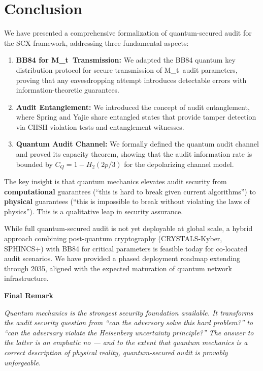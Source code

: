 \documentclass[11pt,a4paper]{article}
\theoremstyle{plain}
\theoremstyle{definition}
\theoremstyle{remark}
\newenvironment{bilingual}[2]{%
  \medskip\noindent\textbf{#1}\par\noindent\textit{#2}\par\smallskip
}{}
\newcommand{\Mt}{M_t}
\begin{document}
\section{Conclusion}
\label{sec:conclusion}

We have presented a comprehensive formalization of quantum-secured audit
for the SCX framework, addressing three fundamental aspects:

\begin{enumerate}[label=(\arabic*)]
  \item \textbf{BB84 for \Mt\ Transmission:} We adapted the BB84 quantum
        key distribution protocol for secure transmission of \Mt\ audit
        parameters, proving that any eavesdropping attempt introduces
        detectable errors with information-theoretic guarantees.
  
  \item \textbf{Audit Entanglement:} We introduced the concept of
        audit entanglement, where Spring and Yajie share entangled
        states that provide tamper detection via CHSH violation tests
        and entanglement witnesses.
  
  \item \textbf{Quantum Audit Channel:} We formally defined the quantum
        audit channel and proved its capacity theorem, showing that the
        audit information rate is bounded by $C_Q = 1 - H_2(2p/3)$
        for the depolarizing channel model.
\end{enumerate}

The key insight is that quantum mechanics elevates audit security from
\textbf{computational} guarantees (``this is hard to break given current
algorithms'') to \textbf{physical} guarantees (``this is impossible to
break without violating the laws of physics''). This is a qualitative
leap in security assurance.

While full quantum-secured audit is not yet deployable at global scale,
a hybrid approach combining post-quantum cryptography (CRYSTALS-Kyber,
SPHINCS+) with BB84 for critical parameters is feasible today for
co-located audit scenarios. We have provided a phased deployment roadmap
extending through 2035, aligned with the expected maturation of quantum
network infrastructure.

\vspace{8pt}
\begin{bilingual}
{Final Remark}
{Quantum mechanics is the strongest security foundation available.
It transforms the audit security question from ``can the adversary
solve this hard problem?'' to ``can the adversary violate the
Heisenberg uncertainty principle?'' The answer to the latter is
an emphatic no — and to the extent that quantum mechanics is a
correct description of physical reality, quantum-secured audit
is provably unforgeable.}
\end{bilingual}
\end{document}
